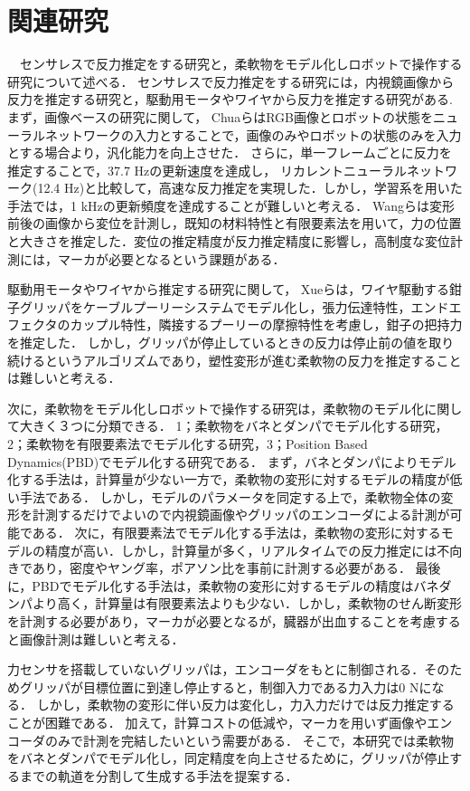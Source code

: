 \documentclass[a4paper]{jarticle}
\begin{document}
\section{関連研究}
　センサレスで反力推定をする研究と，柔軟物をモデル化しロボットで操作する研究について述べる．
センサレスで反力推定をする研究には，内視鏡画像から反力を推定する研究と，駆動用モータやワイヤから反力を推定する研究がある.
まず，画像ベースの研究に関して，
ChuaらはRGB画像とロボットの状態をニューラルネットワークの入力とすることで，画像のみやロボットの状態のみを入力とする場合より，汎化能力を向上させた\cite{ref_Chua}．
さらに，単一フレームごとに反力を推定することで，37.7 Hzの更新速度を達成し，
リカレントニューラルネットワーク(12.4 Hz)と比較して，高速な反力推定を実現した．しかし，学習系を用いた手法では，1 kHzの更新頻度を達成することが難しいと考える．
Wangらは変形前後の画像から変位を計測し，既知の材料特性と有限要素法を用いて，力の位置と大きさを推定した\cite{ref_Wang}．変位の推定精度が反力推定精度に影響し，高制度な変位計測には，マーカが必要となるという課題がある．

駆動用モータやワイヤから推定する研究に関して，
Xueらは，ワイヤ駆動する鉗子グリッパをケーブルプーリーシステムでモデル化し，張力伝達特性，エンドエフェクタのカップル特性，隣接するプーリーの摩擦特性を考慮し，鉗子の把持力を推定した\cite{ref_Xue}．
しかし，グリッパが停止しているときの反力は停止前の値を取り続けるというアルゴリズムであり，塑性変形が進む柔軟物の反力を推定することは難しいと考える．

次に，柔軟物をモデル化しロボットで操作する研究は，柔軟物のモデル化に関して大きく３つに分類できる\cite{ref_review_modeling}．
1；柔軟物をバネとダンパでモデル化する研究，2；柔軟物を有限要素法でモデル化する研究，3；Position Based Dynamics(PBD)でモデル化する研究である．
まず，バネとダンパによりモデル化する手法は，計算量が少ない一方で，柔軟物の変形に対するモデルの精度が低い手法である\cite{ref_MSD}．
しかし，モデルのパラメータを同定する上で，柔軟物全体の変形を計測するだけでよいので内視鏡画像やグリッパのエンコーダによる計測が可能である．
次に，有限要素法でモデル化する手法は，柔軟物の変形に対するモデルの精度が高い\cite{ref_FEM}．しかし，計算量が多く，リアルタイムでの反力推定には不向きであり，密度やヤング率，ポアソン比を事前に計測する必要がある．
最後に，PBDでモデル化する手法は，柔軟物の変形に対するモデルの精度はバネダンパより高く，計算量は有限要素法よりも少ない\cite{ref_PBD}．しかし，柔軟物のせん断変形を計測する必要があり，マーカが必要となるが，臓器が出血することを考慮すると画像計測は難しいと考える．

力センサを搭載していないグリッパは，エンコーダをもとに制御される．そのためグリッパが目標位置に到達し停止すると，制御入力である力入力は0 Nになる．
しかし，柔軟物の変形に伴い反力は変化し，力入力だけでは反力推定することが困難である．
加えて，計算コストの低減や，マーカを用いず画像やエンコーダのみで計測を完結したいという需要がある．
そこで，本研究では柔軟物をバネとダンパでモデル化し，同定精度を向上させるために，グリッパが停止するまでの軌道を分割して生成する手法を提案する．
\end{document}
